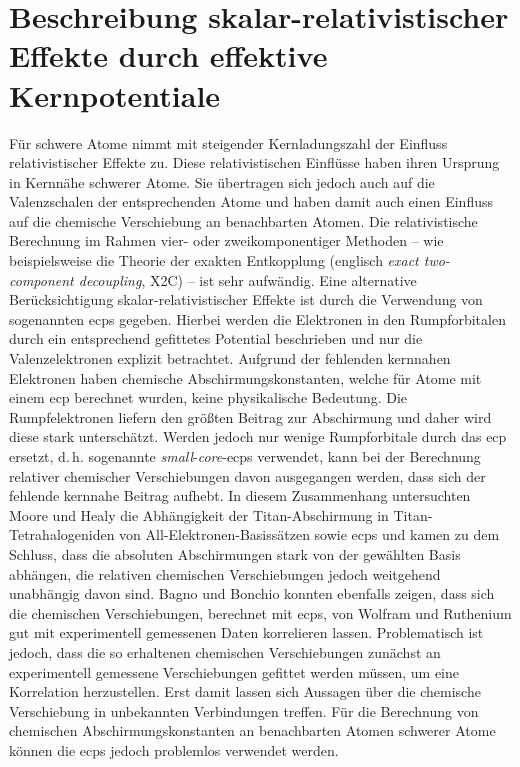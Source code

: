 \section{Beschreibung skalar-relativistischer Effekte durch effektive Kernpotentiale}\label{kap:ecps}
Für schwere Atome nimmt mit steigender Kernladungszahl der Einfluss relativistischer Effekte zu. Diese relativistischen Einflüsse haben ihren Ursprung in Kernnähe schwerer Atome. Sie übertragen sich jedoch auch auf die Valenzschalen der entsprechenden Atome und haben damit auch einen Einfluss auf die chemische Verschiebung an benachbarten Atomen. Die relativistische Berechnung im Rahmen vier- oder zweikomponentiger Methoden -- wie beispielsweise die Theorie der exakten Entkopplung (englisch \textit{exact two-component decoupling}, X2C)\supercite{liu2010ideas,saue2011relativistic,peng2012exact} -- ist sehr aufwändig. Eine alternative Berücksichtigung skalar-relativistischer Effekte ist durch die Verwendung von sogenannten \acfp{ecp}\supercite{cundari1996effective,frenking2007pseudopotential} gegeben. Hierbei werden die Elektronen in den Rumpforbitalen durch ein entsprechend gefittetes Potential beschrieben und nur die Valenzelektronen explizit betrachtet. Aufgrund der fehlenden kernnahen Elektronen haben chemische Abschirmungskonstanten, welche für Atome mit einem \ac{ecp} berechnet wurden, keine physikalische Bedeutung. Die Rumpfelektronen liefern den größten Beitrag zur Abschirmung und daher wird diese stark unterschätzt. Werden jedoch nur wenige Rumpforbitale durch das \ac{ecp} ersetzt, d.\,h. sogenannte \textit{small}-\textit{core}-\acp{ecp} verwendet, kann bei der Berechnung relativer chemischer Verschiebungen davon ausgegangen werden, dass sich der fehlende kernnahe Beitrag aufhebt.\supercite{van2012use} In diesem Zusammenhang untersuchten Moore und Healy\supercite{moore1995ab} die Abhängigkeit der Titan-Abschirmung in Titan-Tetrahalogeniden von All-Elektronen-Basissätzen sowie \acp{ecp} und kamen zu dem Schluss, dass die absoluten Abschirmungen stark von der gewählten Basis abhängen, die relativen chemischen Verschiebungen jedoch weitgehend unabhängig davon sind. Bagno und Bonchio konnten ebenfalls zeigen, dass sich die chemischen Verschiebungen, berechnet mit \acp{ecp}, von Wolfram\supercite{bagno2000effective} und Ruthenium\supercite{bagno2002dft} gut mit experimentell gemessenen Daten korrelieren lassen. Problematisch ist jedoch, dass die so erhaltenen chemischen Verschiebungen zunächst an experimentell gemessene Verschiebungen gefittet werden müssen, um eine Korrelation herzustellen. Erst damit lassen sich Aussagen über die chemische Verschiebung in unbekannten Verbindungen treffen. Für die Berechnung von chemischen Abschirmungskonstanten an benachbarten Atomen schwerer Atome können die \acp{ecp} jedoch problemlos verwendet werden.

